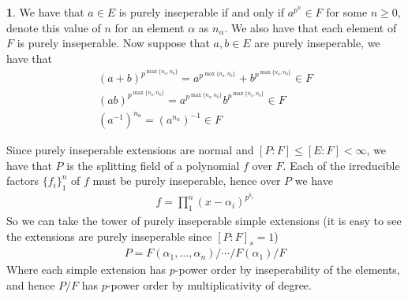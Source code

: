 \documentclass[11pt]{article}
\theoremstyle{definition}
\newtheorem{pb}{}
\newcommand{\set}[1]{\{#1\}}
\begin{document}
    \begin{pb}
        We have that \(a \in E\) is purely inseperable if and only if \(a^{p^n} \in F\) for some \(n \geq 0\), denote this value of \(n\) for an element \(\alpha\) as \(n_\alpha\).
        We also have that each element of \(F\) is purely inseperable. Now suppose that \(a,b \in E\) are purely inseperable, we have that
        \begin{align*}
            (a+b)^{p^{\max\set{n_a,n_b}}} = a^{p^{\max\set{n_a,n_b}}} + b^{p^{\max\set{n_a,n_b}}} \in F \\
            (ab)^{p^{\max\set{n_a,n_b}}} = a^{p^{\max\set{n_a,n_b}}}b^{p^{\max\set{n_a,n_b}}} \in F \\
            (a^{-1})^{n_a} = (a^{n_a})^{-1} \in F
        \end{align*}

        Since purely inseperable extensions are normal and \([P:F] \leq [E:F] < \infty\), we have that \(P\) is the splitting field of a polynomial \(f\) over \(F\).
        Each of the irreducible factors \(\set{f_i}_1^n\) of \(f\) must be purely inseperable, hence over \(P\) we have
        \begin{align*}
            f = \prod_1^n (x-\alpha_i)^{p^{k_i}}
        \end{align*}
        So we can take the tower of purely inseperable simple extensions (it is easy to see the extensions are purely inseperable since \([P:F]_s = 1\))
        \begin{align*}
            P = F(\alpha_1,\hdots,\alpha_n)/\cdots/F(\alpha_1)/F
        \end{align*}
        Where each simple extension has \(p\)-power order by inseperability of the elements, and hence \(P/F\) has \(p\)-power order by multiplicativity of degree.
    \end{pb}
\end{document}
